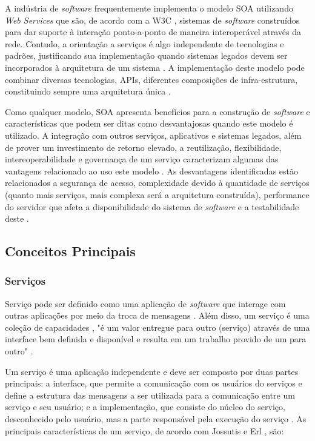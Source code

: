 A indústria de \textit{software} frequentemente implementa o modelo SOA utilizando \textit{Web Services} que são, de acordo com a W3C \cite{haas_web_2004}, sistemas de \textit{software} construídos para dar suporte à interação ponto-a-ponto de maneira interoperável através da rede. Contudo, a orientação a serviços é algo independente de tecnologias e padrões, justificando sua implementação quando sistemas legados devem ser incorporados à arquitetura de um sistema \cite{linthicum_soainrealworld_2007}. A implementação deste modelo pode combinar diversas tecnologias, APIs, diferentes composições de infra-estrutura, constituindo sempre uma arquitetura única \cite{erl_orientacaoaservico_2009}.

Como qualquer modelo, SOA apresenta benefícios para a construção de \textit{software} e características que podem ser ditas como desvantajosas quando este modelo é utilizado. A integração com outros serviços, aplicativos e sistemas legados, além de prover um investimento de retorno elevado, a reutilização, flexibilidade, intereoperabilidade e governança de um serviço caracterizam algumas das vantagens relacionado ao uso este modelo \cite{oqueesoa_2010} \cite{vantagens_desvantagens_soa}. As desvantagens identificadas estão relacionados a segurança de acesso, complexidade devido à quantidade de serviços (quanto mais serviços, mais complexa será a arquitetura construída), performance do servidor que afeta a disponibilidade do sistema de \textit{software} e a testabilidade deste \cite{oqueesoa_2010} \cite{vantagens_desvantagens_soa}.

\subsection{Conceitos Principais}
\subsubsection{Serviços}

Serviço pode ser definido como uma aplicação de \textit{software} que interage com outras aplicações por meio da troca de mensagens \cite{linthicum_soainrealworld_2007}. Além disso, um serviço é uma coleção de capacidades \cite{erl_orientacaoaservico_2009}, "é um valor entregue para outro (serviço) através de uma interface bem definida e disponível e resulta em um trabalho provido de um para outro" \cite{adaptive_ltd_service_2009}.

Um serviço é uma aplicação independente e deve ser composto por duas partes principais: a interface, que permite a comunicação com os usuários do serviços e define a estrutura das mensagens a ser utilizada para a comunicação entre um serviço e seu usuário; e a implementação, que consiste do núcleo do serviço, desconhecido pelo usuário, mas a parte responsável pela execução do serviço \cite{linthicum_soainrealworld_2007} . As principais características de um serviço, de acordo com Jossutis \cite{josuttis_soa_2007} e Erl \cite{erl_orientacaoaservico_2009}, são:

